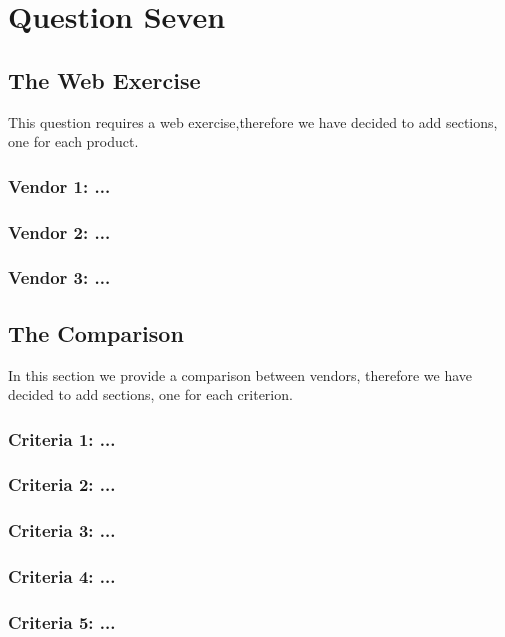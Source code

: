 \documentclass[12p,a4paper]{report}
\begin{document}
\chapter{Question Seven}


\section{The Web Exercise}
This question requires a web exercise,therefore we have decided to add sections, one for each product. 

\subsection{Vendor 1: ...}
    
\subsection{Vendor 2: ...}
    
\subsection{Vendor 3: ...}

\section{The Comparison}
In this section we provide a comparison between vendors, therefore we have decided to add sections, one for each criterion. 

\subsection{Criteria 1: ...}
    
\subsection{Criteria 2: ...}
    
\subsection{Criteria 3: ...}

\subsection{Criteria 4: ...}

\subsection{Criteria 5: ...}
\end{document}
